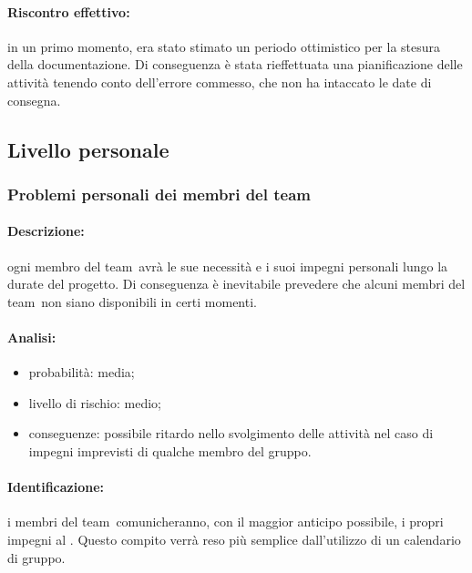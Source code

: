 \documentclass[../PianoProgetto.tex]{subfiles}
\begin{document}
	\paragraph*{Riscontro effettivo:} in un primo momento, era stato stimato un periodo ottimistico per la stesura della documentazione. Di conseguenza è stata rieffettuata una pianificazione delle attività tenendo conto dell'errore commesso, che non ha intaccato le date di consegna.


\subsection{Livello personale}

\subsubsection{Problemi personali dei membri del team}

	\paragraph*{Descrizione:} ogni membro del team\g\ avrà le sue necessità e i suoi impegni personali lungo la durate del progetto. Di conseguenza è inevitabile prevedere che alcuni membri del team\g\ 
non siano disponibili in certi momenti.
	 
	\paragraph*{Analisi:}
	\begin{itemize}
		\item probabilità: media;
		\item livello di rischio: medio;
		\item conseguenze: possibile ritardo nello svolgimento delle attività nel caso di impegni imprevisti di qualche membro del gruppo.
	\end{itemize}	
		
	\paragraph*{Identificazione:} i membri del team\g\ comunicheranno, con il maggior anticipo possibile, i propri impegni al \responsabilediprogetto . Questo compito verrà reso più semplice dall'utilizzo di un calendario di gruppo. 
	
\end{document}
